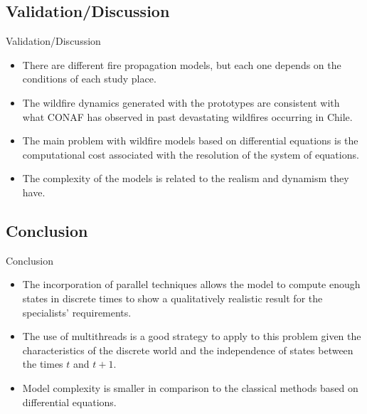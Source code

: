 \documentclass{beamer}
\begin{document}
      \subsection{Validation/Discussion}
        \begin{frame}{Validation/Discussion}
          \begin{itemize}
            \item<1-> There are different fire propagation models, but each one depends on the 
              conditions of each study place.
            \item<2-> The wildfire dynamics generated with the prototypes are consistent with what 
              CONAF has observed in past devastating wildfires occurring in Chile.
            \item<3-> The main problem with wildfire models based on differential equations is the 
              computational cost associated with the resolution of the system of equations.
            \item<4-> The complexity of the models is related to the realism and dynamism they have.
          \end{itemize}
        \end{frame}
      
      \subsection{Conclusion}
        \begin{frame}{Conclusion}
          \begin{itemize}
            \item<1-> The incorporation of parallel techniques allows the model to compute enough 
              states in discrete times to show a qualitatively realistic result for the specialists' requirements.
            \item<2-> The use of multithreads is a good strategy to apply to this problem given 
              the characteristics of the discrete world and the independence of states between the 
              times $t$ and $t + 1$.
            \item<3-> Model complexity is smaller in comparison to the classical methods based on differential 
              equations.
          \end{itemize}
        \end{frame}
      
\end{document}
